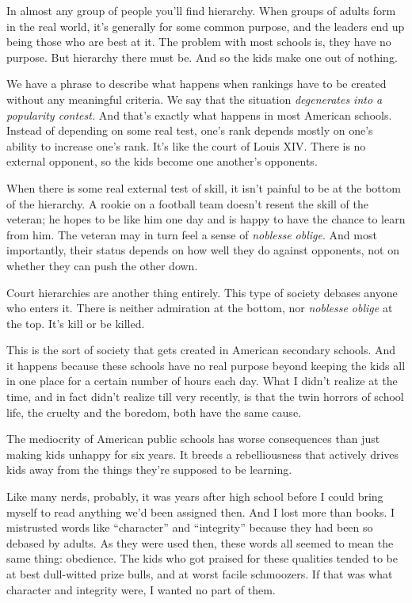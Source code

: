 In almost any group of people you'll find hierarchy. When groups of
adults form in the real world, it's generally for some common purpose,
and the leaders end up being those who are best at it. The problem with
most schools is, they have no purpose. But hierarchy there must be. And
so the kids make one out of nothing.

We have a phrase to describe what happens when rankings have to be
created without any meaningful criteria. We say that the situation
\emph{degenerates into a popularity contest.} And that's exactly what
happens in most American schools. Instead of depending on some real
test, one's rank depends mostly on one's ability to increase one's rank.
It's like the court of Louis XIV. There is no external opponent, so the
kids become one another's opponents.

When there is some real external test of skill, it isn't painful to be
at the bottom of the hierarchy. A rookie on a football team doesn't
resent the skill of the veteran; he hopes to be like him one day and is
happy to have the chance to learn from him. The veteran may in turn feel
a sense of \emph{noblesse oblige}. And most importantly, their status
depends on how well they do against opponents, not on whether they can
push the other down.

Court hierarchies are another thing entirely. This type of society
debases anyone who enters it. There is neither admiration at the bottom,
nor \emph{noblesse oblige} at the top. It's kill or be killed.

This is the sort of society that gets created in American secondary
schools. And it happens because these schools have no real purpose
beyond keeping the kids all in one place for a certain number of hours
each day. What I didn't realize at the time, and in fact didn't realize
till very recently, is that the twin horrors of school life, the cruelty
and the boredom, both have the same cause.

The mediocrity of American public schools has worse consequences than
just making kids unhappy for six years. It breeds a rebelliousness that
actively drives kids away from the things they're supposed to be
learning.

Like many nerds, probably, it was years after high school before I could
bring myself to read anything we'd been assigned then. And I lost more
than books. I mistrusted words like ``character'' and ``integrity''
because they had been so debased by adults. As they were used then,
these words all seemed to mean the same thing: obedience. The kids who
got praised for these qualities tended to be at best dull-witted prize
bulls, and at worst facile schmoozers. If that was what character and
integrity were, I wanted no part of them.

